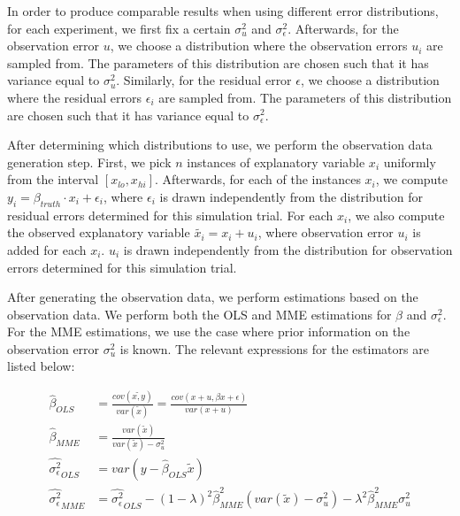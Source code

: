 \documentclass{article}
\begin{document}
In order to produce comparable results when using different error distributions, for each experiment, we first fix a certain $\sigma^2_u$ and $\sigma^2_\epsilon$.
Afterwards, for the observation error $u$, we choose a distribution where the observation errors $u_i$ are sampled from.
The parameters of this distribution are chosen such that it has variance equal to $\sigma_u^2$.
Similarly, for the residual error $\epsilon$, we choose a distribution where the residual errors $\epsilon_i$ are sampled from.
The parameters of this distribution are chosen such that it has variance equal to $\sigma_\epsilon^2$.

After determining which distributions to use, we perform the observation data generation step.
First, we pick $n$ instances of explanatory variable $x_i$ uniformly from the interval $[x_{lo}, x_{hi}]$.
Afterwards, for each of the instances $x_i$, we compute $y_i = \beta_{truth} \cdot x_i + \epsilon_i$, where $\epsilon_i$ is drawn independently from the distribution for residual errors determined for this simulation trial.
For each $x_i$, we also compute the observed explanatory variable $\tilde{x_i} = x_i + u_i$, where observation error $u_i$ is added for each $x_i$. $u_i$ is drawn independently from the distribution for observation errors determined for this simulation trial.

After generating the observation data, we perform estimations based on the observation data. We perform both the OLS and MME estimations for $\beta$ and $\sigma_\epsilon^2$. For the MME estimations, we use the case where prior information on the observation error $\sigma_u^2$ is known. The relevant expressions for the estimators are listed below:

\begin{equation}
    \begin{split}
        \hat{\beta}_{OLS} &= \frac{cov(\tilde{x, y})}{var(\tilde{x})} = \frac{cov(x+u, \beta x + \epsilon)}{var(x + u)}\\
        \hat{\beta}_{MME} &= \frac{var(\tilde{x})}{var(\tilde{x}) - \sigma^2_u}\\
        \hat{\sigma^2_\epsilon}_{OLS} &= var\left(y - \hat{\beta}_{OLS} \tilde{x}\right)\\
        \hat{\sigma^2_\epsilon}_{MME} &= \hat{\sigma^2_\epsilon}_{OLS} -  (1-\lambda)^2 \hat{\beta}_{MME}^2 (var(\tilde{x}) - \sigma^2_u) - \lambda^2 \hat{\beta}_{MME}^2 \sigma^2_u\\
    \end{split}
\end{equation}
\end{document}
